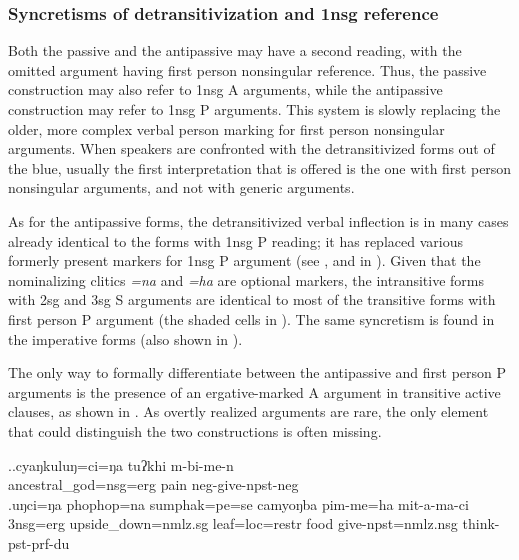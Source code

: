 \subsubsection{Syncretisms of detransitivization and {\sc 1nsg} re\-fe\-rence}\label{detrans-polite}

Both the passive and the antipassive may have a second reading, with the omitted argument having first person nonsingular reference. Thus, the passive construction may also refer to 1{\sc nsg} A arguments, while the antipassive construction may refer to 1{\sc nsg}  P arguments. This system is slowly replacing the older, more complex verbal person marking for first person nonsingular arguments. When speakers are confronted with the detransitivized forms out of the blue, usually the first interpretation that is offered is the one with first person nonsingular arguments, and not with generic arguments. 

As for the antipassive forms, the detransitivized verbal inflection is in many cases already identical to the forms with 1{\sc nsg}  P reading; it has replaced various formerly present markers for 1{\sc nsg}  P argument (see , and  in ).
Given that the nominalizing clitics \emph{=na} and \emph{=ha} are optional markers, the intransitive forms with 2sg and 3sg S arguments are identical to most of the transitive forms with first person P argument (the shaded cells in ). The same syncretism is found in the imperative forms (also shown in ).


The only way to formally differentiate between the antipassive and first person  P arguments is the presence of an ergative-marked A argument in transitive active clauses, as shown in \Next. As overtly realized arguments are rare, the only  element that could distinguish the two constructions is often missing.  

\ex.\ag.cyaŋkuluŋ=ci=ŋa     tuʔkhi m-bi-me-n\\
ancestral\_god{\sc =nsg=erg} pain {\sc neg-}give{\sc [3A;1.P]-npst-neg}\\
\bg.uŋci=ŋa   phophop=na  sumphak=pe=se   camyoŋba pim-me=ha mit-a-ma-ci\\
{\sc 3nsg=erg} upside\_down{\sc =nmlz.sg} leaf{\sc =loc=restr} food  give{\sc [3A;1.P]-npst=nmlz.nsg} think{\sc -pst-prf-du}\\


